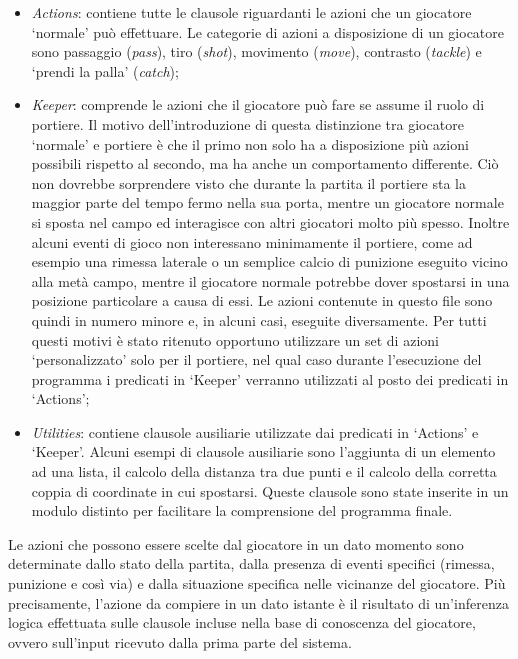 \begin{itemize}
	\item \emph{Actions}: contiene tutte le clausole riguardanti le azioni che un giocatore `normale' pu\`{o} effettuare. Le categorie di azioni a disposizione di un giocatore sono passaggio (\emph{pass}), tiro (\emph{shot}), movimento (\emph{move}), contrasto (\emph{tackle}) e `prendi la palla' (\emph{catch}); 
	\item \emph{Keeper}: comprende le azioni che il giocatore pu\`{o} fare se assume il ruolo di portiere. Il motivo dell'introduzione di questa distinzione tra giocatore `normale' e portiere \`{e}  che il primo non solo ha a disposizione pi\`{u}  azioni possibili rispetto al secondo, ma ha anche un comportamento differente. Ci\`{o}  non dovrebbe sorprendere visto che durante la partita il portiere sta la maggior parte del tempo fermo nella sua porta, mentre un giocatore normale si sposta nel campo ed interagisce con altri giocatori molto pi\`{u}  spesso. Inoltre alcuni eventi di gioco non interessano minimamente il portiere, come ad esempio una rimessa laterale o un semplice calcio di punizione eseguito vicino alla met\`{a}  campo, mentre il giocatore normale potrebbe dover spostarsi in una posizione particolare a causa di essi. Le azioni contenute in questo file sono quindi in numero minore e, in alcuni casi, eseguite diversamente. Per tutti questi motivi \`{e}  stato ritenuto opportuno utilizzare un set di azioni `personalizzato' solo per il portiere, nel qual caso durante l'esecuzione del programma i predicati in `Keeper' verranno utilizzati al posto dei predicati in `Actions';
	\item \emph{Utilities}: contiene clausole ausiliarie utilizzate dai predicati in `Actions' e `Keeper'. Alcuni esempi di clausole ausiliarie sono l'aggiunta di un elemento ad una lista, il calcolo della distanza tra due punti e il calcolo della corretta coppia di coordinate in cui spostarsi. Queste clausole sono state inserite in un modulo distinto per facilitare la comprensione del programma finale.
\end{itemize}

Le azioni che possono essere scelte dal giocatore in un dato momento sono determinate dallo stato della partita, dalla presenza di eventi specifici (rimessa, punizione e così via) e dalla situazione specifica nelle vicinanze del giocatore. Pi\`{u} precisamente, l'azione da compiere in un dato istante \`{e} il risultato di un'inferenza logica effettuata sulle clausole incluse nella base di conoscenza del giocatore, ovvero sull'input ricevuto dalla prima parte del sistema.

